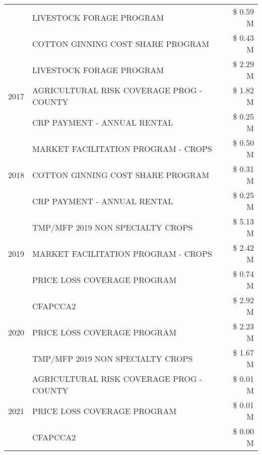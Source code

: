 \begin{tabular}{llr}
 & LIVESTOCK FORAGE PROGRAM                      & \$ 0.59 M \\
 & COTTON GINNING COST SHARE PROGRAM             & \$ 0.43 M \\
\cline{1-3}
\multirow[t]{3}{*}{2017} & LIVESTOCK FORAGE PROGRAM & \$ 2.29 M \\
 & AGRICULTURAL RISK COVERAGE PROG - COUNTY & \$ 1.82 M \\
 & CRP PAYMENT - ANNUAL RENTAL & \$ 0.25 M \\
\cline{1-3}
\multirow[t]{3}{*}{2018} & MARKET FACILITATION PROGRAM - CROPS & \$ 0.50 M \\
 & COTTON GINNING COST SHARE PROGRAM & \$ 0.31 M \\
 & CRP PAYMENT - ANNUAL RENTAL & \$ 0.25 M \\
\cline{1-3}
\multirow[t]{3}{*}{2019} & TMP/MFP 2019 NON SPECIALTY CROPS & \$ 5.13 M \\
 & MARKET FACILITATION PROGRAM - CROPS & \$ 2.42 M \\
 & PRICE LOSS COVERAGE PROGRAM & \$ 0.74 M \\
\cline{1-3}
\multirow[t]{3}{*}{2020} & CFAPCCA2 & \$ 2.92 M \\
 & PRICE LOSS COVERAGE PROGRAM & \$ 2.23 M \\
 & TMP/MFP 2019 NON SPECIALTY CROPS & \$ 1.67 M \\
\cline{1-3}
\multirow[t]{3}{*}{2021} & AGRICULTURAL RISK COVERAGE PROG - COUNTY & \$ 0.01 M \\
 & PRICE LOSS COVERAGE PROGRAM & \$ 0.01 M \\
 & CFAPCCA2 & \$ 0.00 M \\
\cline{1-3}
\bottomrule
\end{tabular}
